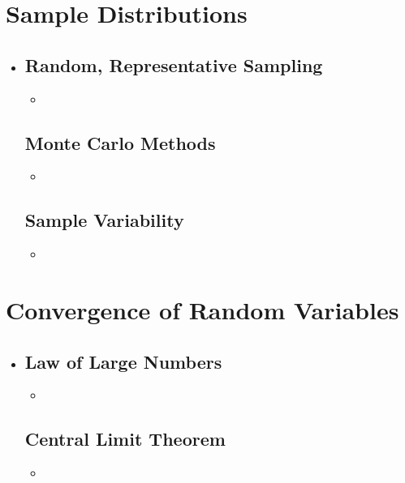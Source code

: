 \section{Sample Distributions}
\begin{itemize}
  \item[]
  
  \subsection{Random, Representative Sampling}
  \begin{itemize}
    \item 
  \end{itemize}

  \subsection{Monte Carlo Methods}
  \begin{itemize}
    \item 
  \end{itemize}
  
  \subsection{Sample Variability}
  \begin{itemize}
    \item 
  \end{itemize}
  
\end{itemize}

\section{Convergence of Random Variables}
\begin{itemize}
  \item[]
  
  \subsection{Law of Large Numbers}
  \begin{itemize}
    \item 
  \end{itemize}

  \subsection{Central Limit Theorem}
  \begin{itemize}
    \item 
  \end{itemize}
  
\end{itemize}
